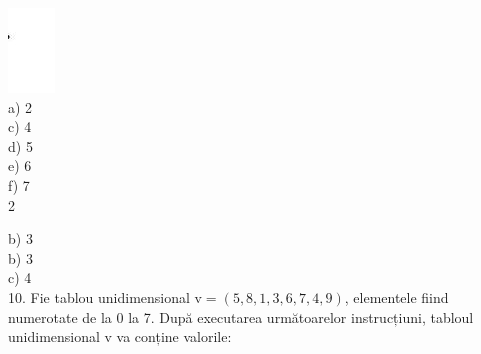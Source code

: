 \documentclass[10pt]{article}
\begin{document}
\includegraphics[max width=\textwidth, center]{2025_04_17_46e04c6acd873ea9558dg-142(11)}\\
a) 2\\
c) 4\\
d) 5\\
e) 6\\
f) 7\\
2

b) 3\\
b) 3\\
c) 4\\
10. Fie tablou unidimensional $\mathrm{v}=(5,8,1,3,6,7,4,9)$, elementele fiind numerotate de la 0 la 7. După executarea următoarelor instrucțiuni, tabloul unidimensional v va conține valorile:
\end{document}
